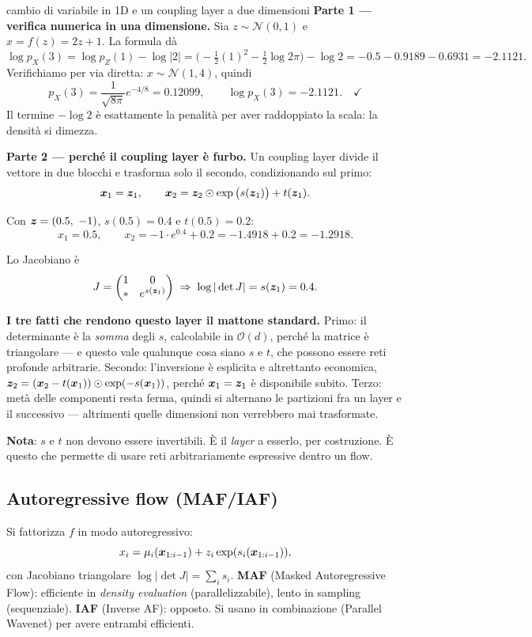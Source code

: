 \begin{esempiosvolto}{cambio di variabile in 1D e un coupling layer a due dimensioni}
\textbf{Parte 1 — verifica numerica in una dimensione.} Sia $z \sim \mathcal{N}(0,1)$ e $x = f(z) = 2z + 1$. La formula dà
\[
\log p_X(3) = \log p_Z(1) - \log|2| = \big(-\tfrac{1}{2}(1)^2 - \tfrac{1}{2}\log 2\pi\big) - \log 2 = -0.5 - 0.9189 - 0.6931 = \mathbf{-2.1121}.
\]
Verifichiamo per via diretta: $x \sim \mathcal{N}(1, 4)$, quindi
\[
p_X(3) = \frac{1}{\sqrt{8\pi}} e^{-4/8} = 0.12099, \qquad \log p_X(3) = \mathbf{-2.1121}. \quad\checkmark
\]
Il termine $-\log 2$ è esattamente la penalità per aver raddoppiato la scala: la densità si dimezza.

\medskip
\textbf{Parte 2 — perché il coupling layer è furbo.} Un coupling layer divide il vettore in due blocchi e trasforma solo il secondo, condizionando sul primo:
\[
\bm{x}_1 = \bm{z}_1, \qquad \bm{x}_2 = \bm{z}_2 \odot \exp\big(s(\bm{z}_1)\big) + t(\bm{z}_1).
\]

Con $\bm{z} = (0.5,\ -1)$, $s(0.5) = 0.4$ e $t(0.5) = 0.2$:
\[
x_1 = 0.5, \qquad x_2 = -1 \cdot e^{0.4} + 0.2 = -1.4918 + 0.2 = -1.2918.
\]

Lo Jacobiano è
\[
J = \begin{pmatrix} 1 & 0 \\ * & e^{s(\bm{z}_1)} \end{pmatrix}
\;\Rightarrow\;
\log|\det J| = s(\bm{z}_1) = 0.4.
\]

\medskip
\textbf{I tre fatti che rendono questo layer il mattone standard.} Primo: il determinante è la \emph{somma} degli $s$, calcolabile in $\mathcal{O}(d)$, perché la matrice è triangolare — e questo vale qualunque cosa siano $s$ e $t$, che possono essere reti profonde arbitrarie. Secondo: l'inversione è esplicita e altrettanto economica, $\bm{z}_2 = (\bm{x}_2 - t(\bm{x}_1)) \odot \exp(-s(\bm{x}_1))$, perché $\bm{x}_1 = \bm{z}_1$ è disponibile subito. Terzo: metà delle componenti resta ferma, quindi si alternano le partizioni fra un layer e il successivo — altrimenti quelle dimensioni non verrebbero mai trasformate.

\textbf{Nota}: $s$ e $t$ non devono essere invertibili. È il \emph{layer} a esserlo, per costruzione. È questo che permette di usare reti arbitrariamente espressive dentro un flow.
\end{esempiosvolto}

\subsection{Autoregressive flow (MAF/IAF)}
Si fattorizza $f$ in modo autoregressivo:
\[
x_i = \mu_i(\bm{x}_{1:i-1}) + z_i \exp(s_i(\bm{x}_{1:i-1})),
\]
con Jacobiano triangolare $\log|\det J| = \sum_i s_i$. \textbf{MAF} (Masked Autoregressive Flow): efficiente in \emph{density evaluation} (parallelizzabile), lento in sampling (sequenziale). \textbf{IAF} (Inverse AF): opposto. Si usano in combinazione (Parallel Wavenet) per avere entrambi efficienti.

